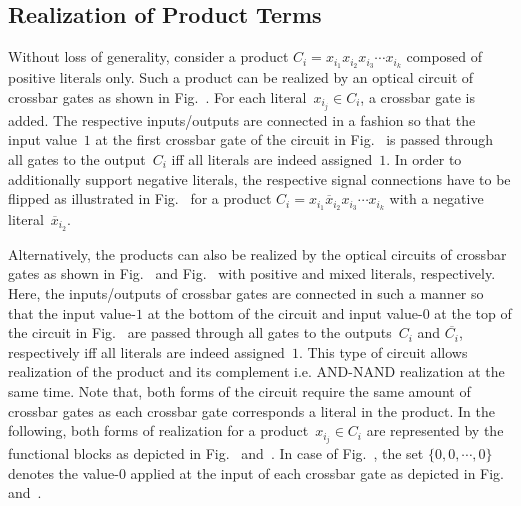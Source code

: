 \documentclass[10pt,letterpaper,twoside,openright]{book}
\begin{document}
\subsection{Realization of Product Terms}
Without loss of generality, 
consider a product \mbox{$C_{i}=x_{i_{1}}x_{i_{2}}x_{i_{3}}\cdots x_{i_{k}}$} composed of positive
literals only.
Such a product can be realized by an optical circuit of crossbar gates as shown in 
Fig.~. 
For each literal~$x_{i_{j}}\in C_{i}$,
a crossbar gate is added. The respective inputs/outputs are connected in a fashion
so that the input value~$1$ at the first crossbar gate of the circuit in Fig.~ is passed through all gates to the output~$C_{i}$ iff all literals are indeed assigned~$1$. In order to additionally support negative literals, the respective signal connections have to
be flipped as illustrated in Fig.~ for a product 
$C_{i}=x_{i_{1}}\overline{x}_{i_{2}}x_{i_{3}}\cdots x_{i_{k}}$
with a negative literal~$\overline{x}_{i_{2}}$.

Alternatively, the products can also be realized by the optical circuits of crossbar gates as shown in   Fig.~ and Fig.~ with positive and mixed literals, respectively. Here, the inputs/outputs of crossbar gates are connected in such a manner so that the input value-$1$ at the bottom of the circuit and input value-$0$ at the top of the circuit in Fig.~ are passed through all gates to the outputs~$C_{i}$ and $\overline{C_{i}}$, respectively iff all literals are indeed assigned~$1$. This type of circuit allows realization of the product and its complement i.e. AND-NAND realization at the same time.
Note that, both forms of the circuit require the same amount of crossbar gates as each crossbar gate corresponds a literal in the product. In the following, both forms of realization for a product~\mbox{$x_{i_{j}}\in C_{i}$} are represented by the functional blocks as depicted in Fig.~ and~. In case of Fig.~, the set $\{0,0,\cdots,0\}$ denotes the value-$0$ applied at the input of each crossbar gate as depicted in Fig.~ and~.  
\end{document}

